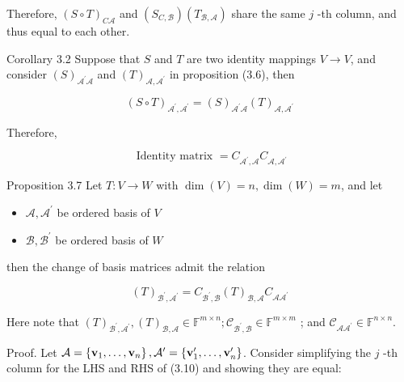 \documentclass[11pt]{article}
\begin{document}
Therefore, \({\left( S \circ  T\right) }_{C\mathcal{A}}\) and \(\left( {S}_{C,\mathcal{B}}\right) \left( {T}_{\mathcal{B},\mathcal{A}}\right)\) share the same \(j\) -th column, and thus equal to each other.

Corollary 3.2 Suppose that \(S\) and \(T\) are two identity mappings \(V \rightarrow  V\), and consider \({\left( S\right) }_{{\mathcal{A}}^{\prime }\mathcal{A}}\) and \({\left( T\right) }_{\mathcal{A},{\mathcal{A}}^{\prime }}\) in proposition (3.6), then

\[
{\left( S \circ  T\right) }_{{\mathcal{A}}^{\prime },{\mathcal{A}}^{\prime }} = {\left( S\right) }_{{\mathcal{A}}^{\prime }\mathcal{A}}{\left( T\right) }_{\mathcal{A},{\mathcal{A}}^{\prime }}
\]

Therefore,

\[
\text{ Identity matrix } = {C}_{{\mathcal{A}}^{\prime },\mathcal{A}}{C}_{\mathcal{A},{\mathcal{A}}^{\prime }}
\]

Proposition 3.7 Let \(T : V \rightarrow  W\) with \(\dim \left( V\right)  = n,\dim \left( W\right)  = m\), and let

\begin{itemize}
\item \(\mathcal{A},{\mathcal{A}}^{\prime }\) be ordered basis of \(V\)
\end{itemize}

\begin{itemize}
\item \(\mathcal{B},{\mathcal{B}}^{\prime }\) be ordered basis of \(W\)
\end{itemize}

then the change of basis matrices admit the relation

\[
{\left( T\right) }_{{\mathcal{B}}^{\prime },{\mathcal{A}}^{\prime }} = {C}_{{\mathcal{B}}^{\prime },\mathcal{B}}{\left( T\right) }_{\mathcal{B},\mathcal{A}}{C}_{\mathcal{A}{\mathcal{A}}^{\prime }} \tag{3.10}
\]

Here note that \({\left( T\right) }_{{\mathcal{B}}^{\prime },{\mathcal{A}}^{\prime }},{\left( T\right) }_{\mathcal{B},\mathcal{A}} \in  {\mathbb{F}}^{m \times  n};{\mathcal{C}}_{{\mathcal{B}}^{\prime },\mathcal{B}} \in  {\mathbb{F}}^{m \times  m}\) ; and \({\mathcal{C}}_{\mathcal{A}{\mathcal{A}}^{\prime }} \in  {\mathbb{F}}^{n \times  n}\).

Proof. Let \(\mathcal{A} = \left\{  {{\bf v}_1,\ldots ,{\bf v}_n}\right\}  ,{\mathcal{A}}^{\prime } = \left\{  {{\bf v}_1^{\prime },\ldots ,{\bf v}_n^{\prime }}\right\}\). Consider simplifying the \(j\) -th column for the LHS and RHS of (3.10) and showing they are equal:
\end{document}

